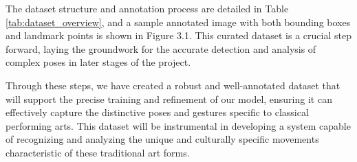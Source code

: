 The dataset structure and annotation process are detailed in Table \ref{tab:dataset_overview}, and a sample annotated image with both bounding boxes and landmark points is shown in Figure 3.1. This curated dataset is a crucial step forward, laying the groundwork for the accurate detection and analysis of complex poses in later stages of the project.

\begin{table}[h]
\centering
{}
\caption{Dataset Overview}
\label{tab:dataset_overview}
\end{table}

Through these steps, we have created a robust and well-annotated dataset that will support the precise training and refinement of our model, ensuring it can effectively capture the distinctive poses and gestures specific to classical performing arts. This dataset will be instrumental in developing a system capable of recognizing and analyzing the unique and culturally specific movements characteristic of these traditional art forms.

\clearpage

